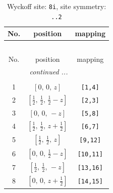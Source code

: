 \documentclass[fleqn,8pt]{jsarticle}
\begin{document}
\begin{longtable}{ccc}
\caption{Wyckoff site: {\tt 8i}, site symmetry: {\tt ..2}}
 \\
 \hline \hline
No. & position & mapping \\ \hline \endfirsthead

\multicolumn{2}{l}{\tablename\ \thetable{}} \\
 \hline \hline
No. & position & mapping \\ \hline \endhead

 \hline \hline
\multicolumn{2}{r}{\footnotesize\it continued ...} \\ \endfoot

 \hline \hline
\multicolumn{2}{r}{} \\ \endlastfoot

1 & $\left[ 0,\, 0,\, z \right]$ & {\tt [1,4]} \\ \hline
2 & $\left[ \frac{1}{2},\, \frac{1}{2},\, \frac{1}{2} - z \right]$ & {\tt [2,3]} \\ \hline
3 & $\left[ 0,\, 0,\, - z \right]$ & {\tt [5,8]} \\ \hline
4 & $\left[ \frac{1}{2},\, \frac{1}{2},\, z + \frac{1}{2} \right]$ & {\tt [6,7]} \\ \hline
5 & $\left[ \frac{1}{2},\, \frac{1}{2},\, z \right]$ & {\tt [9,12]} \\ \hline
6 & $\left[ 0,\, 0,\, \frac{1}{2} - z \right]$ & {\tt [10,11]} \\ \hline
7 & $\left[ \frac{1}{2},\, \frac{1}{2},\, - z \right]$ & {\tt [13,16]} \\ \hline
8 & $\left[ 0,\, 0,\, z + \frac{1}{2} \right]$ & {\tt [14,15]} \\
\end{longtable}
\renewcommand{\arraystretch}{1.2}
\end{document}
